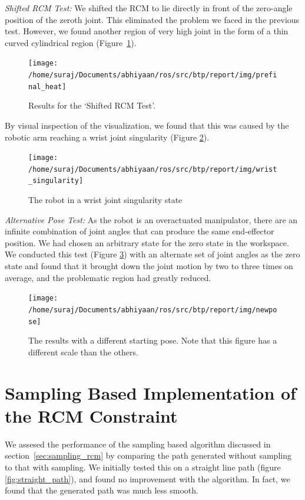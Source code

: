 \documentclass[BTech]{iitmdiss}
\begin{document}
    \emph{Shifted RCM Test:} We shifted the RCM to lie directly in front of the zero-angle position of the zeroth joint.
    This eliminated the problem we faced in the previous test.
    However, we found another region of very high joint in the form of a thin curved cylindrical region (Figure~\ref{fig:prefinal_heat}).

    \begin{figure}
        \centering
        \texttt{[image: /home/suraj/Documents/abhiyaan/ros/src/btp/report/img/prefinal\_heat]}
        \caption{Results for the `Shifted RCM Test'.}
        \label{fig:prefinal_heat}
    \end{figure}

    By visual inspection of the visualization, we found that this was caused by the robotic arm reaching a wrist joint singularity (Figure \ref{fig:wrist_singularity}).

    \begin{figure}
        \centering
        \texttt{[image: /home/suraj/Documents/abhiyaan/ros/src/btp/report/img/wrist\_singularity]}
        \caption{The robot in a wrist joint singularity state}
        \label{fig:wrist_singularity}
    \end{figure}

    \emph{Alternative Pose Test:} As the robot is an overactuated manipulator, there are an infinite combination of joint angles that
    can produce the same end-effector position.
    We had chosen an arbitrary state for the zero state in the workspace.
    We conducted this test (Figure \ref{fig:newpose}) with an alternate set of joint angles as the zero state and found
    that it brought down the joint motion by two to three times on average, and the problematic region had greatly reduced.

    \begin{figure}
        \centering
        \texttt{[image: /home/suraj/Documents/abhiyaan/ros/src/btp/report/img/newpose]}
        \caption{The results with a different starting pose. Note that this figure has a different scale than the others.}
        \label{fig:newpose}
    \end{figure}


    \section{Sampling Based Implementation of the RCM Constraint}

    We assesed the performance of the sampling based algorithm discussed in section~\ref{sec:sampling_rcm} by
    comparing the path generated without sampling to that with sampling.
    We initially tested this on a straight line path (figure \ref{fig:straight_path}), and found no improvement with the algorithm.
    In fact, we found that the generated path was much less smooth.
\end{document}
